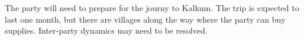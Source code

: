 The party will need to prepare for the journy to Kalkum.
The trip is expected to last one month, but there are villages along the way where the party can buy supplies.
Inter-party dynamics may need to be resolved.
